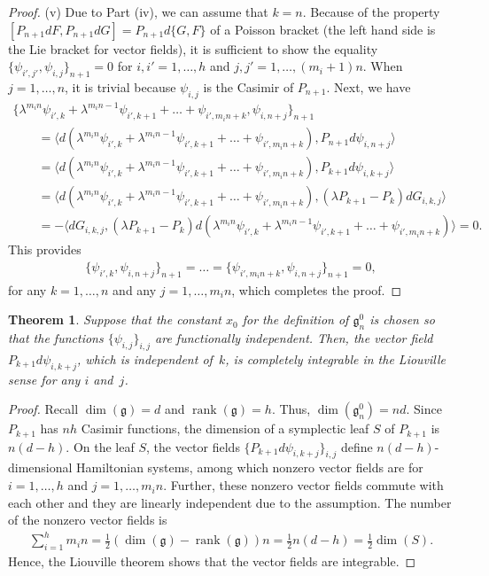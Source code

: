 \documentclass[pdftex]{sigma}
\numberwithin{equation}{section}
\newtheorem{Theorem}{Theorem}[section]
\begin{document}
\begin{proof}
(v) Due to Part (iv), we can assume that $k=n$. Because of the property $[P_{n+1}dF, P_{n+1}dG] = P_{n+1}d\{ G,F\}$ of a Poisson bracket (the left hand side is the Lie bracket for vector f\/ields), it is suf\/f\/icient to show the equality $\{ \psi_{i',j'}, \psi_{i,j}\}_{n+1} = 0$ for $i,i' = 1,\dots ,h$ and $j,j' = 1,\dots ,(m_i+1)n$. When $j=1,\dots ,n$, it is trivial because $\psi_{i,j}$ is the Casimir of $P_{n+1}$. Next, we have
\begin{gather*}
 \{ \lambda ^{m_in}\psi_{i',k}+\lambda ^{m_in-1}\psi_{i',k+1} +\dots + \psi_{i', m_in+k}, \psi_{i,n+j} \}_{n+1} \\
\qquad{} = \langle d(\lambda ^{m_in}\psi_{i',k}+\lambda ^{m_in-1}\psi_{i',k+1} +\dots + \psi_{i', m_in+k}) ,
 P_{n+1}d\psi _{i,n+j} \rangle \\
\qquad{} = \langle d(\lambda ^{m_in}\psi_{i',k}+\lambda ^{m_in-1}\psi_{i',k+1} +\dots + \psi_{i', m_in+k}) ,
 P_{k+1}d\psi _{i,k+j} \rangle \\
\qquad{} = \langle d(\lambda ^{m_in}\psi_{i',k}+\lambda ^{m_in-1}\psi_{i',k+1} +\dots + \psi_{i', m_in+k}) ,
 (\lambda P_{k+1} - P_k)dG_{i,k,j} \rangle \\
\qquad{} = -\langle dG_{i,k,j} , (\lambda P_{k+1}-P_k)d(\lambda ^{m_in}\psi_{i',k}+\lambda ^{m_in-1}\psi_{i',k+1} +\dots + \psi_{i', m_in+k}) \rangle =0.
\end{gather*}
This provides
\begin{gather*}
\{ \psi_{i',k}, \psi_{i, n+j}\}_{n+1} = \dots = \{ \psi_{i',m_in+k}, \psi_{i, n+j}\}_{n+1} = 0,
\end{gather*}
for any $k=1,\dots ,n$ and any $j=1,\dots ,m_in$, which completes the proof.
\end{proof}

\begin{Theorem}\label{theorem2.4}
Suppose that the constant $x_0$ for the definition of $\mathfrak{g}^0_n$ is chosen so that the functions $\{ \psi_{i,j}\}_{i,j}$ are functionally independent. Then, the vector field $P_{k+1}d\psi_{i, k+j}$, which is independent of~$k$, is completely integrable in the Liouville sense for any $i$ and~$j$.
\end{Theorem}

\begin{proof} Recall $\dim (\mathfrak{g}) = d$ and $\operatorname{rank}(\mathfrak{g}) = h$. Thus, $\dim (\mathfrak{g}^0_n) = nd$. Since $P_{k+1}$ has $nh$ Casimir functions, the dimension of a symplectic leaf $S$ of $P_{k+1}$ is $n(d-h)$. On the leaf $S$, the vector f\/ields $\{ P_{k+1}d\psi_{i, k+j} \}_{i,j}$ def\/ine $n(d-h)$-dimensional Hamiltonian systems, among which nonzero vector f\/ields are for $i=1,\dots ,h$ and $j=1, \dots ,m_in$.
Further, these nonzero vector f\/ields commute with each other and they are linearly independent due to the assumption. The number of the nonzero vector f\/ields is
\begin{gather*}
\sum^h_{i=1}m_in = \frac{1}{2}(\dim (\mathfrak{g}) - \operatorname{rank}(\mathfrak{g}))n = \frac{1}{2}n (d-h) = \frac{1}{2} \dim (S).
\end{gather*}
Hence, the Liouville theorem shows that the vector f\/ields are integrable.
\end{proof}
\end{document}
